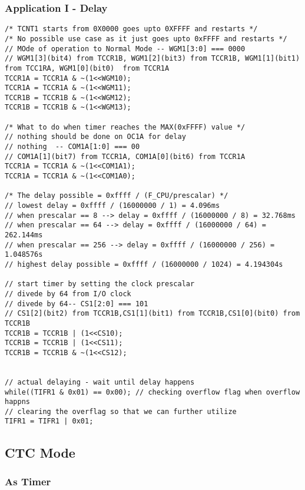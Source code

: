 \subsubsection{Application I - Delay}
\begin{verbatim}
/* TCNT1 starts from 0X0000 goes upto 0XFFFF and restarts */
/* No possible use case as it just goes upto 0xFFFF and restarts */
// MOde of operation to Normal Mode -- WGM1[3:0] === 0000
// WGM1[3](bit4) from TCCR1B, WGM1[2](bit3) from TCCR1B, WGM1[1](bit1)  from TCC1RA, WGM1[0](bit0)  from TCCR1A	
TCCR1A = TCCR1A & ~(1<<WGM10);
TCCR1A = TCCR1A & ~(1<<WGM11);
TCCR1B = TCCR1B & ~(1<<WGM12);
TCCR1B = TCCR1B & ~(1<<WGM13);

/* What to do when timer reaches the MAX(0xFFFF) value */
// nothing should be done on OC1A for delay
// nothing  -- COM1A[1:0] === 00
// COM1A[1](bit7) from TCCR1A, COM1A[0](bit6) from TCCR1A
TCCR1A = TCCR1A & ~(1<<COM1A1);
TCCR1A = TCCR1A & ~(1<<COM1A0);
    
/* The delay possible = 0xffff / (F_CPU/prescalar) */
// lowest delay = 0xffff / (16000000 / 1) = 4.096ms
// when prescalar == 8 --> delay = 0xffff / (16000000 / 8) = 32.768ms
// when prescalar == 64 --> delay = 0xffff / (16000000 / 64) = 262.144ms
// when prescalar == 256 --> delay = 0xffff / (16000000 / 256) = 1.048576s
// highest delay possible = 0xffff / (16000000 / 1024) = 4.194304s

// start timer by setting the clock prescalar
// divede by 64 from I/O clock
// divede by 64-- CS1[2:0] === 101
// CS1[2](bit2) from TCCR1B,CS1[1](bit1) from TCCR1B,CS1[0](bit0) from TCCR1B
TCCR1B = TCCR1B | (1<<CS10);
TCCR1B = TCCR1B | (1<<CS11);
TCCR1B = TCCR1B & ~(1<<CS12);


// actual delaying - wait until delay happens
while((TIFR1 & 0x01) == 0x00); // checking overflow flag when overflow happns
// clearing the overflag so that we can further utilize
TIFR1 = TIFR1 | 0x01;
\end{verbatim}

\subsection{CTC Mode}
\subsubsection{As Timer}

